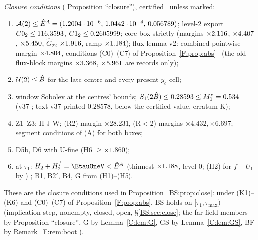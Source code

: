 \documentclass[11pt]{article}
\begin{document}
\noindent\emph{Closure conditions} ( Proposition ``closure''), certified \tC\ unless marked:
\begin{enumerate}[label=(K\arabic*),leftmargin=2.6em]
\item $\mathcal A(2)\le\hat E^A=(1.2004\cdot10^{-6},\,1.0442\cdot10^{-4},\,0.056789)$; level-2 export $C0_2\le116.3593$, $C1_2\le0.2605999$; core box strictly (margins $\times2.116$, $\times4.407$, $\times5.450$, $\hat G_{22}$ $\times1.916$, ramp $\times1.184$); flux lemma v2: combined pointwise margin $\times4.804$, conditions (C0)--(C7) of Proposition~\ref{F:prop:abs} \tC\ (the old flux-block margins $\times3.368$, $\times5.961$ are records only);
\item $\mathcal U(2)\le\hat B$ for the late centre and every present $y_c$-cell;
\item window Sobolev at the centres' bounds; $S_1(2\hat B)\le0.28593\le M_1^z=0.534$ (v37 ; text v37 printed $0.28578$, below the certified value, erratum K);
\item Z1--Z3; H-J-W; (R2) margin $\times28.231$, (R$<$2) margins $\times4.432,\times6.697$; segment conditions of (A) for both boxes;
\item D5b, D6 with U-fine (H6 $\ge\times1.860$);
\item at $\tau_1$: $H_2+H^f_2=\EtauOneV<\Eh$ (thinnest $\times1.188$, level 0; (H2) for $f-U_1$ by ) \tB; B1, B2$'$, B4, G from (H1)--(H5).
\end{enumerate}
These are the closure conditions used in Proposition~\ref{BS:prop:close}: under (K1)--(K6) and (C0)--(C7) of Proposition~\ref{F:prop:abs}, $\mathrm{BS}$ holds on $[\tau_1,\tau_{\max})$ (implication step, nonempty, closed, open, \S\ref{BS:sec:close}; the far-field members by  Proposition ``closure'', G by Lemma~\ref{C:lem:G}, GS by Lemma~\ref{C:lem:GS}, BF by Remark~\ref{F:rem:boot}).



\end{document}

